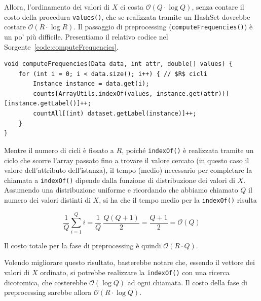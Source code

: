 \documentclass[a4paper,11pt,twoside,openright,fleqn]{book}
\renewcommand{\lstlistingname}{Sorgente}
\newcommand{\code}[1]{\texttt{#1}}
\newcommand{\bigO}{\mathcal{O}}
\begin{document}
Allora, l'ordinamento dei valori di $X$ ci costa $\bigO(Q \cdot \log Q)$, senza contare il costo della procedura \code{values()}, che se realizzata tramite un HashSet dovrebbe costare $\bigO(R \cdot \log R)$. Il passaggio di preprocessing (\code{computeFrequencies()}) è un po' più difficile. Presentiamo il relativo codice nel \lstlistingname\ \ref{code:computeFrequencies}.

\begin{lstlisting}[float=htbp,mathescape,label=code:computeFrequencies,caption=Fase di preprocessing]
void computeFrequencies(Data data, int attr, double[] values) {
	for (int i = 0; i < data.size(); i++) { // $R$ cicli
		Instance instance = data.get(i);
		counts[ArrayUtils.indexOf(values, instance.get(attr))][instance.getLabel()]++;
		countAll[(int) dataset.getLabel(instance)]++;
	}
}
\end{lstlisting}


Mentre il numero di cicli è fissato a $R$, poiché \code{indexOf()} è realizzata tramite un ciclo che scorre l'array passato fino a trovare il valore cercato (in questo caso il valore dell'attributo dell'istanza), il tempo (medio) necessario per completare la chiamata a \code{indexOf()} dipende dalla funzione di distribuzione dei valori di $X$. Assumendo una distribuzione uniforme e ricordando che abbiamo chiamato $Q$ il numero dei valori distinti di $X$, si ha che il tempo medio per la \code{indexOf()} risulta

\begin{equation}
\frac 1 Q \sum_{i = 1}^Q i = \frac 1 Q \: \frac{Q (Q + 1)}{2} = \frac{Q + 1}{2} = \bigO(Q) %
\end{equation}

Il costo totale per la fase di preprocessing è quindi $\bigO(R \cdot Q)$.

Volendo migliorare questo risultato, basterebbe notare che, essendo il vettore dei valori di $X$ ordinato, si potrebbe realizzare la \code{indexOf()} con una ricerca dicotomica, che costerebbe $\bigO(\log Q)$ ad ogni chiamata. Il costo della fase di preprocessing sarebbe allora $\bigO(R \cdot \log Q)$.
\end{document}
